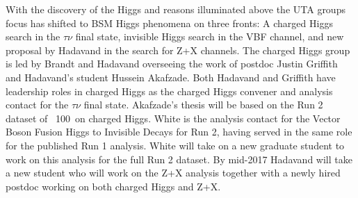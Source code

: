 With the discovery of the Higgs and reasons illuminated above the UTA groups focus has shifted to BSM Higgs phenomena on three fronts: A charged Higgs search in the $\tau \nu$ final state, invisible Higgs search in the VBF channel,
and new proposal by Hadavand in the search for Z+X channels.  The charged Higgs group is led by Brandt and Hadavand overseeing the work of postdoc Justin Griffith and Hadavand's student Hussein Akafzade.
Both Hadavand and Griffith have leadership roles in charged Higgs as the charged Higgs convener and analysis contact for the $\tau \nu$ final state.  Akafzade's thesis will be based on the Run 2 dataset of ~100\invfb\ on charged Higgs.
White is the analysis contact for the Vector Boson Fusion Higgs to Invisible Decays for Run 2, having served in the same role for the published Run 1 analysis. White will take on a new graduate student to work on this analysis for the full Run 2 dataset.
By mid-2017 Hadavand will take a new student who will work on the Z+X analysis together with a newly hired postdoc working on both charged Higgs and Z+X.  


